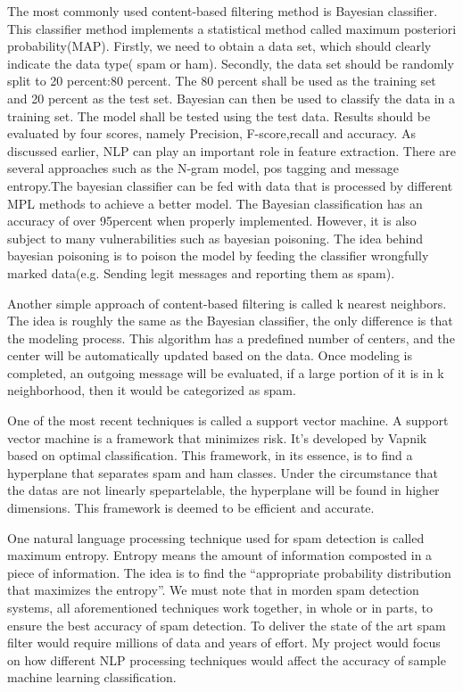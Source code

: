 \documentclass{article}
\begin{document}
The most commonly used content-based filtering method is Bayesian classifier. This classifier method implements a statistical method called maximum posteriori probability(MAP).\cite{Khorsi} Firstly, we need to obtain a data set, which should clearly indicate the data type( spam or ham). Secondly, the data set should be randomly split to 20 percent:80 percent. The 80 percent shall be used as the training set and 20 percent as the test set. Bayesian can then be used to classify the data in a training set. The model shall be tested using the test data. Results should be evaluated by four scores, namely Precision, F-score,recall and accuracy.\cite{Muhammad} As discussed earlier, NLP can play an important role in feature extraction. There are several approaches such as the N-gram model\cite{tunga}, pos tagging and message entropy.\cite{Ezpeleta}The bayesian classifier can be fed with data that is processed by different MPL methods to achieve a better model. The Bayesian classification has an accuracy of over 95percent when properly implemented. However, it is also subject to many vulnerabilities such as bayesian poisoning. The idea behind bayesian poisoning is to poison the model by feeding the classifier wrongfully marked data(e.g. Sending legit messages and reporting them as spam).\cite{Blanzieri} 


Another simple approach of content-based filtering is called k nearest neighbors.\cite{Khorsi} The idea is roughly the same as the Bayesian classifier, the only difference is that the modeling process. This algorithm has a predefined number of centers, and the center will be automatically updated based on the data. Once modeling is completed, an outgoing message will be evaluated, if a large portion of it is in k neighborhood, then it would be categorized as spam. 


One of the most recent techniques is called a support vector machine. A support vector machine is a framework that minimizes risk.\cite{Subramaniam} It’s developed by Vapnik based on optimal classification.  This framework, in its essence, is to find a hyperplane that separates spam and ham classes. Under the circumstance that the datas are not linearly spepartelable, the hyperplane will be found in higher dimensions.\cite{Khorsi} This framework is deemed to be efficient and accurate. 


One natural language processing technique used for spam detection is called maximum entropy. Entropy means the amount of information composted in a piece of information. The idea is to find the “appropriate probability distribution that maximizes the entropy”.\cite{Khorsi}
We must note that in morden spam detection systems, all aforementioned techniques work together, in whole or in parts, to ensure the best accuracy of spam detection. To deliver the state of the art spam filter would require millions of data and years of effort. My project would focus on how different NLP processing techniques would affect the accuracy of sample machine learning classification.
\end{document}
